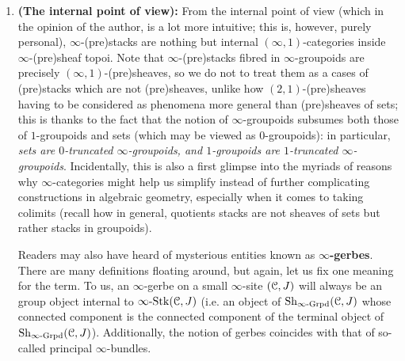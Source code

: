 \begin{convention}
\begin{enumerate}
                        \item \textbf{(The internal point of view):} From the internal point of view (which in the opinion of the author, is a lot more intuitive; this is, however, purely personal), $\infty$-(pre)stacks are nothing but internal $(\infty, 1)$-categories inside $\infty$-(pre)sheaf topoi. Note that $\infty$-(pre)stacks fibred in $\infty$-groupoids are precisely $(\infty, 1)$-(pre)sheaves, so we do not to treat them as a cases of (pre)stacks which are not (pre)sheaves, unlike how $(2, 1)$-(pre)sheaves having to be considered as phenomena more general than (pre)sheaves of sets; this is thanks to the fact that the notion of $\infty$-groupoids subsumes both those of $1$-groupoids and sets (which may be viewed as $0$-groupoids): in particular, \textit{sets are $0$-truncated $\infty$-groupoids, and $1$-groupoids are $1$-truncated $\infty$-groupoids}. Incidentally, this is also a first glimpse into the myriads of reasons why $\infty$-categories might help us simplify instead of further complicating constructions in algebraic geometry, especially when it comes to taking colimits (recall how in general, quotients stacks are not sheaves of sets but rather stacks in groupoids).
                    
                        Readers may also have heard of mysterious entities known as \textbf{$\infty$-gerbes}. There are many definitions floating around, but again, let us fix one meaning for the term. To us, an $\infty$-gerbe on a small $\infty$-site $(\mathcal{C}, J)$ will always be an group object internal to $\infty\text{-}\mathrm{Stk}(\mathcal{C}, J)$ (i.e. an object of $\mathrm{Sh}_{\infty\text{-}\mathrm{Grpd}}(\mathcal{C}, J)$ whose connected component is the connected component of the terminal object of $\mathrm{Sh}_{\infty\text{-}\mathrm{Grpd}}(\mathcal{C}, J)$). Additionally, the notion of gerbes coincides with that of so-called principal $\infty$-bundles.
                    \end{enumerate}
                \end{convention}
                
